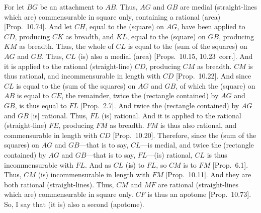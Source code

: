 For let $BG$ be an attachment to $AB$. Thus,
$AG$ and $GB$ are medial (straight-lines which are)
commensurable in square only, containing a rational (area)
[Prop.~10.74]. And let $CH$, equal to
the (square) on $AG$, have been applied to $CD$, producing $CK$
as breadth, and $KL$, equal to the (square) on $GB$, producing $KM$ as
breadth. Thus, the whole of $CL$ is equal to the (sum of the squares)
on $AG$ and $GB$. Thus, $CL$ (is) also a medial (area) [Props.~10.15, 10.23~corr.]. And it is
applied to the rational (straight-line) $CD$, producing $CM$ as breadth.
$CM$ is thus rational, and incommensurable in length with
$CD$ [Prop.~10.22]. And since $CL$ is equal to the
(sum of the squares) on $AG$ and $GB$, of which the (square)
on $AB$ is equal to $CE$, 
the remainder, twice  the (rectangle contained) by $AG$ and $GB$, is thus equal to $FL$ [Prop.~2.7]. And twice the (rectangle contained)
by $AG$ and $GB$ [is] rational. Thus, $FL$ (is) rational. And it
is applied to the rational (straight-line) $FE$, producing $FM$ as breadth.
$FM$ is thus also rational, and commensurable in length with $CD$
[Prop.~10.20]. Therefore, since the (sum of the squares) on $AG$ and $GB$---that is to say, $CL$---is medial, 
and twice the (rectangle contained) by $AG$ and $GB$---that is to say,
$FL$---(is) rational, $CL$ is thus incommensurable with $FL$. 
And as $CL$ (is) to $FL$, so $CM$ is to $FM$ [Prop.~6.1]. Thus, $CM$ (is) incommensurable
in length with $FM$ [Prop.~10.11]. And they are both rational (straight-lines). Thus, $CM$ and $MF$ are rational (straight-lines which are) commensurable in square only. $CF$ is thus an
apotome [Prop.~10.73]. So, I say that (it is)
also a second (apotome).

\epsfysize=1.6in
\centerline{}

